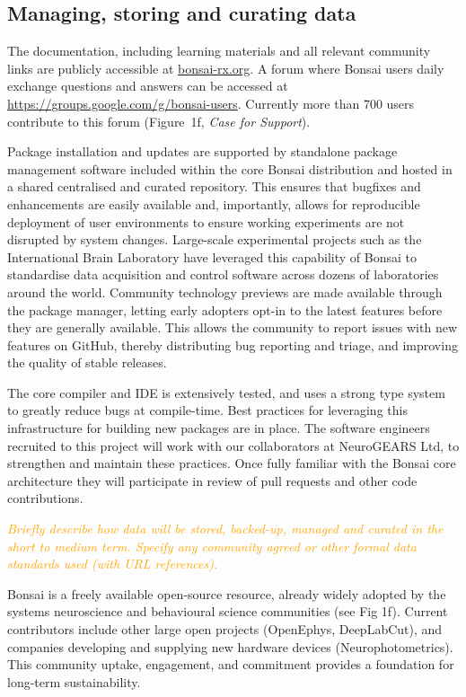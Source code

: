 \documentclass[a4paper,11pt]{article}
\begin{document}
\subsection{Managing, storing and curating data}

The documentation, including learning materials and all relevant community
links are publicly accessible at \url{bonsai-rx.org}. A forum where Bonsai
users daily exchange questions and answers can be accessed at
\url{https://groups.google.com/g/bonsai-users}. Currently more than 700 users
contribute to this forum (Figure~1f, \emph{Case for Support}).

Package installation and updates are supported by standalone package management
software included within the core Bonsai distribution and hosted in a shared
centralised and curated repository. This ensures that bugfixes and enhancements
are easily available and, importantly, allows for reproducible deployment of
user environments to ensure working experiments are not disrupted by system
changes.
%
Large-scale experimental projects such as the International Brain Laboratory
have leveraged this capability of Bonsai to standardise data acquisition and
control software across dozens of laboratories around the world.
%
Community technology previews are made available through the package manager,
letting early adopters opt-in to the latest features before they are generally
available. This allows the community to report issues with new features on
GitHub, thereby distributing bug reporting and triage, and improving the
quality of stable releases.

The core compiler and IDE is extensively tested, and uses a strong type system
to greatly reduce bugs at compile-time. Best practices for leveraging this
infrastructure for building new packages are in place. The software engineers
recruited to this project will work with our collaborators at NeuroGEARS Ltd,
to strengthen and maintain these practices. Once fully familiar with the Bonsai
core architecture they will participate in review of pull requests and other
code contributions.

\textcolor{orange}{\textit{Briefly describe how data will be stored, backed-up, managed and curated in the short to medium term. Specify any community agreed or other formal data standards used (with URL references).}}

Bonsai is a freely available open-source resource, already widely adopted by
the systems neuroscience and behavioural science communities (see Fig 1f).
Current contributors include other large open projects (OpenEphys, DeepLabCut),
and companies developing and supplying new hardware devices
(Neurophotometrics). This community uptake, engagement, and commitment provides
a foundation for long-term sustainability.
\end{document}

